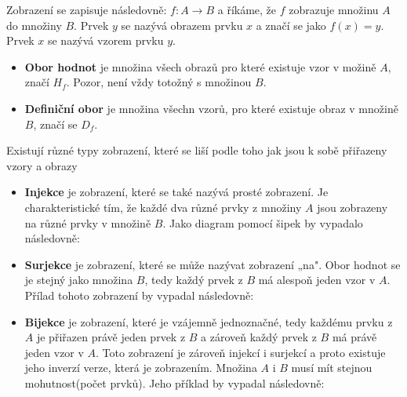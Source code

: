 \documentclass[12pt]{article}
\begin{document}
Zobrazení se zapisuje následovně: $f: A \rightarrow B$ a říkáme, že $f$ zobrazuje množinu $A$ do množiny $B$. Prvek $y$ se nazývá obrazem prvku $x$ a značí se jako $f(x) = y$. Prvek $x$ se nazývá vzorem prvku $y$.
\begin{itemize}[itemsep = 2pt]
    \item \textbf{Obor hodnot} je množina všech obrazů pro které existuje vzor v možině  $A$, značí $H_f$. Pozor, není vždy totožný s množinou $B$.
    \item \textbf{Definiční obor} je množina všechn vzorů, pro které existuje obraz v množině $B$, značí se $D_f$.
\end{itemize}
Existují různé typy zobrazení, které se liší podle toho jak jsou k sobě přiřazeny vzory a obrazy
\begin{itemize}[itemsep = 2pt]
    \item \textbf{Injekce} je zobrazení, které se také nazývá prosté zobrazení. Je charakteristické tím, že každé dva různé prvky z množiny $A$ jsou zobrazeny na různé prvky v množině $B$. Jako diagram pomocí šipek by vypadalo následovně: \\
    
    \item \textbf{Surjekce} je zobrazení, které se může nazývat zobrazení „na". Obor hodnot se je stejný jako množina $B$, tedy každý prvek z $B$ má alespoň jeden vzor v $A$. Přílad tohoto zobrazení by vypadal následovně:\\
    \item \textbf{Bijekce} je zobrazení, které je vzájemně jednoznačné, tedy každému prvku z $A$ je přiřazen právě jeden prvek z $B$ a zároveň každý prvek z $B$ má právě jeden vzor v $A$. Toto zobrazení je zároveň injekcí i surjekcí a proto existuje jeho inverzí verze, která je zobrazením. Množina $A$ i $B$ musí mít stejnou mohutnost(počet prvků). Jeho příklad by vypadal následovně:\\
\end{itemize}
\end{document}
